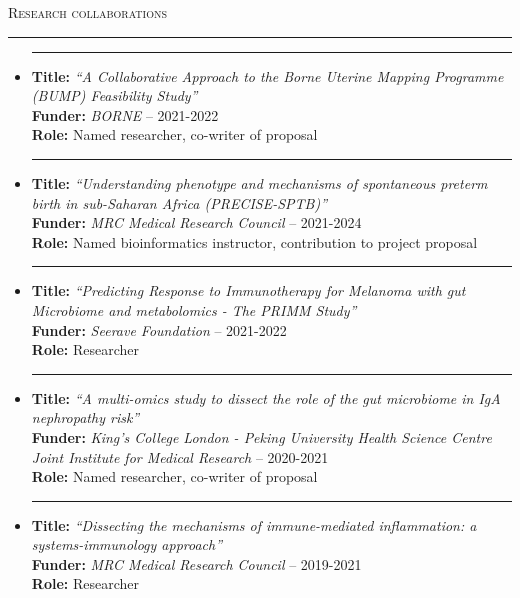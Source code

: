 \documentclass[a4paper,10pt]{article}
\newcommand{\mediumtitle}[1]{
	\vspace{0.2cm}
	{\noindent
	\Large \textsc{#1}\\[-2ex]
	\hrule
	\vspace{0.2cm}}
}
\newcommand{\noitem}{\item[]}
\begin{document}

\mediumtitle{Research collaborations}

\begin{itemize}[leftmargin=*,itemsep=1.2ex]

	\noitem\rule{1mm}{0pt}  \begin{minipage}[t]{0.94\textwidth}
		\textbf{Title:} \emph{``A Collaborative Approach to the Borne Uterine Mapping Programme (BUMP) Feasibility Study''}\\
		\textbf{Funder:} \emph{BORNE} -- 2021-2022\\
		\textbf{Role:} Named researcher, co-writer of proposal
	\end{minipage}


	\noitem\rule{1mm}{0pt}  \begin{minipage}[t]{0.94\textwidth}
		\textbf{Title:} \emph{``Understanding phenotype and mechanisms of spontaneous preterm birth in sub-Saharan Africa (PRECISE-SPTB)''}\\
		\textbf{Funder:} \emph{MRC Medical Research Council} -- 2021-2024\\
		\textbf{Role:} Named bioinformatics instructor,  contribution to project proposal
	\end{minipage}
	
	\noitem\rule{1mm}{0pt}  \begin{minipage}[t]{0.94\textwidth}
		\textbf{Title:} \emph{``Predicting Response to Immunotherapy for Melanoma with gut Microbiome and metabolomics - The PRIMM Study''}\\
		\textbf{Funder:} \emph{Seerave Foundation} -- 2021-2022\\
		\textbf{Role:} Researcher
	\end{minipage}

	\noitem\rule{1mm}{0pt}  \begin{minipage}[t]{0.94\textwidth}
		\textbf{Title:} \emph{``A multi-omics study to dissect the role of the gut microbiome in IgA nephropathy risk''}\\
		\textbf{Funder:} \emph{King's College London - Peking University Health Science Centre Joint Institute for Medical Research} -- 2020-2021\\
		\textbf{Role:} Named researcher, co-writer of proposal
	\end{minipage}
	
	\noitem\rule{1mm}{0pt}  \begin{minipage}[t]{0.94\textwidth}
		\textbf{Title:} \emph{``Dissecting the mechanisms of immune-mediated inflammation: a systems-immunology approach''}\\
		\textbf{Funder:} \emph{MRC Medical Research Council} -- 2019-2021\\
		\textbf{Role:} Researcher
	\end{minipage}
	

\end{itemize}
\end{document}
